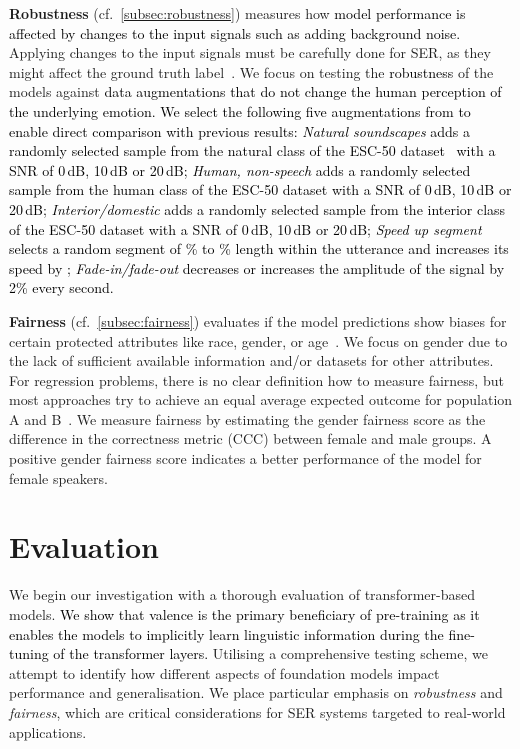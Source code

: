 \documentclass{article}
\newcommand{\review}[1]{\textcolor{black}{#1}}
\newcommand{\cf}{{cf.\ }}
\begin{document}
\textbf{Robustness} (\cf \cref{subsec:robustness})
measures how
\review{
model performance is affected by changes
to the input signals
such as adding background noise.
}
Applying changes to the input signals 
must be carefully done for \ac{SER},
as they might affect the ground truth label~\citep{jaiswal2021robustness,parada2017augmentation}.
We focus on testing the \review{robustness} of the models
against
\review{
data augmentations
that 
do not change the human perception
of the underlying emotion.
We select the following five augmentations 
from \citet{jaiswal2021robustness}
to enable direct comparison with previous results:
\emph{Natural soundscapes} adds a randomly selected sample
from the natural class of the ESC-50 dataset~\citep{piczak2015dataset}
with a \ac{SNR} of 0\,dB, 10\,dB or 20\,dB;
\emph{Human, non-speech} adds a randomly selected sample
from the human class of the ESC-50 dataset
with a \ac{SNR} of 0\,dB, 10\,dB or 20\,dB;
\emph{Interior/domestic} adds a randomly selected sample
from the interior class of the ESC-50 dataset
with a \ac{SNR} of 0\,dB, 10\,dB or 20\,dB;
\emph{Speed up segment} selects a random segment of \% to \% length
within the utterance
and increases its speed by ;
\emph{Fade-in/fade-out} decreases or increases the amplitude
of the signal by 2\% every second.
}

\textbf{Fairness} (\cf \cref{subsec:fairness})
evaluates if the model predictions show biases
for certain protected attributes like race, gender, or age~\citep{corbett-davies2018fairness}.
We focus on gender
due to the lack of sufficient available information and/or datasets for other attributes.
For regression problems,
there is no clear definition how to measure fairness,
but most approaches try to achieve an equal average
expected outcome for population A and B~\citep{fitzsimons2019fairness}.
We measure fairness by estimating the gender fairness score as the difference in the correctness metric (CCC) between female and male groups.
A positive gender fairness score indicates a better performance of the model for female speakers.




\section{Evaluation}
\label{sec:evaluation}

We begin our investigation with a thorough evaluation of transformer-based models.
\review{We show that valence is the primary beneficiary of pre-training as it enables the models to implicitly learn linguistic information during the fine-tuning of the transformer layers.}
Utilising a comprehensive testing scheme,
we attempt to identify how different aspects of foundation models
impact performance and generalisation.
We place particular emphasis on \emph{robustness} and \emph{fairness},
which are critical considerations for \ac{SER} systems targeted to real-world applications.
\end{document}
